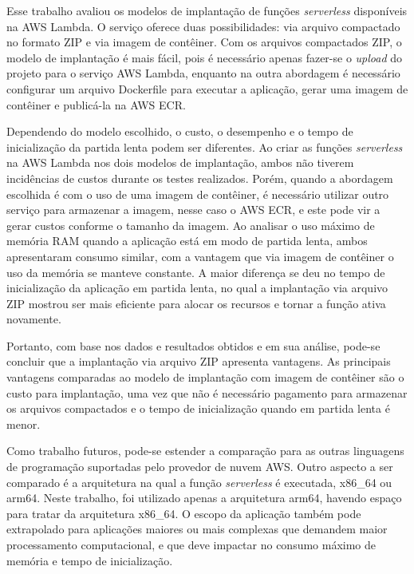\documentclass[conference]{IEEEtran}
\begin{document}
Esse trabalho avaliou os modelos de implantação de funções \textit{serverless} disponíveis na AWS Lambda. O serviço oferece duas possibilidades: via arquivo compactado no formato ZIP e via imagem de contêiner. Com os arquivos compactados ZIP, o modelo de implantação é mais fácil, pois é necessário apenas fazer-se o \textit{upload} do projeto para o serviço AWS Lambda, enquanto na outra abordagem é necessário configurar um arquivo Dockerfile para executar a aplicação, gerar uma imagem de contêiner e publicá-la na AWS ECR.

Dependendo do modelo escolhido, o custo, o desempenho e o tempo de inicialização da partida lenta podem ser diferentes.
Ao criar as funções \textit{serverless} na AWS Lambda nos dois modelos de implantação, ambos não tiverem incidências de custos durante os testes realizados. Porém, quando a abordagem escolhida é com o uso de uma imagem de contêiner, é necessário utilizar outro serviço para armazenar a imagem, nesse caso o AWS ECR, e este pode vir a gerar custos conforme o tamanho da imagem. Ao analisar o uso máximo de memória RAM quando a aplicação está em modo de partida lenta, ambos apresentaram consumo similar, com a vantagem que via imagem de contêiner o uso da memória se manteve constante. A maior diferença se deu no tempo de inicialização da aplicação em partida lenta, no qual a implantação via arquivo ZIP mostrou ser mais eficiente para alocar os recursos e tornar a função ativa novamente.

Portanto, com base nos dados e resultados obtidos e em sua análise, pode-se concluir que a implantação via arquivo ZIP apresenta vantagens. As principais vantagens comparadas ao modelo de implantação com imagem de contêiner são o custo para implantação, uma vez que não é necessário pagamento para armazenar os arquivos compactados e o tempo de inicialização quando em partida lenta é menor.  

Como trabalho futuros, pode-se estender a comparação para as outras linguagens de programação suportadas pelo provedor de nuvem AWS. Outro aspecto a ser comparado é a arquitetura na qual a função \textit{serverless} é executada, x86\_64 ou arm64. Neste trabalho, foi utilizado apenas a arquitetura arm64, havendo espaço para tratar da arquitetura x86\_64. O escopo da aplicação também pode extrapolado para aplicações maiores ou mais complexas que demandem maior processamento computacional, e que deve impactar no consumo máximo de memória e tempo de inicialização.




\end{document}
